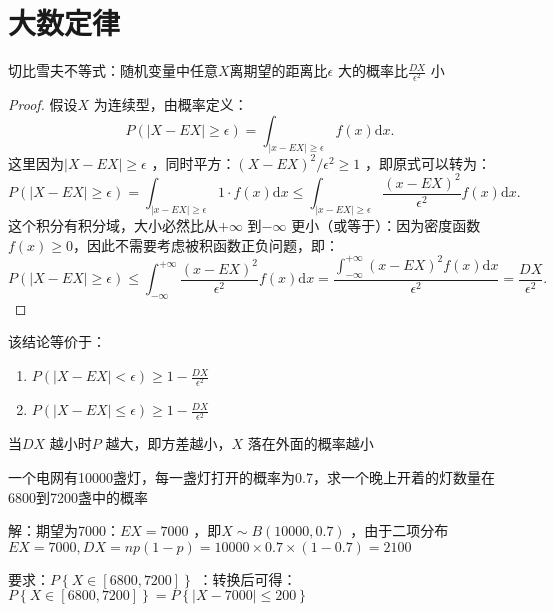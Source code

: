 \section{大数定律}%
\label{sec:大数定律}
\begin{cor}
    切比雪夫不等式：随机变量中任意$X$离期望的距离比$\epsilon$ 大的概率比$\frac{DX}{\epsilon^2 }$ 小
\end{cor}
\begin{proof}
    假设$X$ 为连续型，由概率定义：\[
        P\left( \left| X-EX \right|\ge \epsilon \right)=\int_{\left| x-EX \right|\ge \epsilon}^{} f\left( x \right) \mathrm{d}x
    .\]
    这里因为$\left| X-EX \right|\ge \epsilon$ ，同时平方：$\left( X-EX \right)^2 /\epsilon^2 \ge 1$ ，即原式可以转为：\[
        P\left( \left| X-EX \right|\ge \epsilon \right)=\int_{\left| x-EX \right|\ge \epsilon}^{} 1\cdot f\left( x \right) \mathrm{d}x \le \int_{\left| x-EX \right|\ge \epsilon}^{} \frac{\left( x-EX \right)^2 }{\epsilon^2 }f\left( x \right) \mathrm{d}x
    .\]
    这个积分有积分域，大小必然比从$+\infty $ 到$-\infty $ 更小（或等于）：因为密度函数$f\left( x \right)\ge 0$，因此不需要考虑被积函数正负问题，即：\[
        P\left( \left| X-EX \right|\ge \epsilon \right)\le \int_{-\infty }^{+\infty} \frac{\left( x-EX \right)^2 }{\epsilon^2 }f\left( x \right) \mathrm{d}x=\frac{\int_{-\infty}^{+\infty} \left( x-EX \right)^2f\left( x \right)  \mathrm{d}x}{\epsilon^2 }=\frac{DX}{\epsilon^2 }
    .\]
\end{proof}
该结论等价于：
\begin{enumerate}
    \item $P\left( \left| X-EX \right|<\epsilon \right)\ge 1-\frac{DX}{\epsilon^2 }$
    \item $P\left( \left| X-EX \right|\le \epsilon \right)\ge 1-\frac{DX}{\epsilon^2 }$
\end{enumerate}
当$DX$ 越小时$P$ 越大，即方差越小，$X$ 落在外面的概率越小
\begin{eg}
    一个电网有10000盏灯，每一盏灯打开的概率为0.7，求一个晚上开着的灯数量在6800到7200盏中的概率
\end{eg}
解：期望为7000：$EX=7000$ ，即$X\sim B\left( 10000,0.7 \right)$ ，由于二项分布$EX=7000,DX=np\left( 1-p \right)=10000\times 0.7\times \left( 1-0.7\right)=2100$ 

要求：$P\left\{ X\in [6800,7200] \right\}$ ：转换后可得：$P\left\{ X\in [6800,7200] \right\}=P\left\{ \left| X-7000 \right|\le 200 \right\}$


